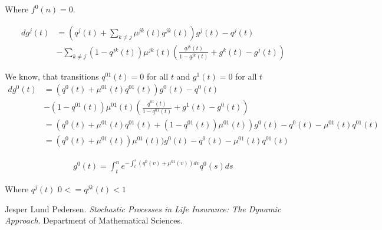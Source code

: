 \documentclass[10pt]{article}
\begin{document}
Where $f^0(n) = 0$.

\begin{equation}
\begin{split}
dg^j(t) & = (q^j(t) + \sum_{k\neq j}
\mu^{jk}(t) q^{jk}(t)) g^j(t) -q^j(t) \\
& - \sum_{k\neq j}(1-q^{jk}(t))\mu^{jk}(t)(\frac{q^{jk}(t)}{1-q^{jk}(t)}+g^k(t)-g^j(t))
\end{split}
\end{equation}

We know, that transitions $q^{01}(t) = 0$ for all $t$ and $g^1(t) = 0$ for all $t$
\begin{equation}
\begin{split}
dg^0(t) & = (q^0(t) + 
\mu^{01}(t) q^{01}(t)) g^0(t) -q^0(t) \\
& - (1-q^{01}(t))\mu^{01}(t)(\frac{q^{01}(t)}{1-q^{01}(t)}+g^1(t)-g^0(t)) \\
& = (q^0(t) + \mu^{01}(t) q^{01}(t) + (1-q^{01}(t))\mu^{01}(t)) g^0(t) -q^0(t) - \mu^{01}(t)q^{01}(t) \\
& = (q^0(t) + \mu^{01}(t))\mu^{01}(t)) g^0(t) -q^0(t) - \mu^{01}(t)q^{01}(t) 
\end{split}
\end{equation}

\begin{equation}
\begin{split}
g^0(t) = \int_t^n e^{-\int_t^s(q^0(v) + \mu^{01}(v))dv} q^0(s)ds
\end{split}
\end{equation}

Where $q^j(t)$ $0 <= q^{jk}(t) < 1$

\newpage

\begin{thebibliography}{9}

  Jesper Lund Pedersen.
  \textit{Stochastic Processes in Life Insurance: The Dynamic Approach}.
  Department of Mathematical Sciences.

\end{thebibliography}
\end{document}
